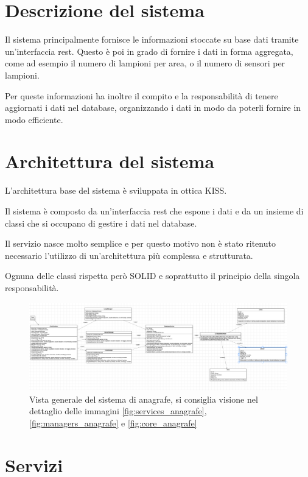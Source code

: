 \section{Descrizione del sistema}

Il sistema principalmente fornisce le informazioni stoccate su base dati tramite un'interfaccia rest.
Questo è poi in grado di fornire i dati in forma aggregata, come ad esempio il numero di lampioni per area, o il numero di sensori per lampioni.

Per queste informazioni ha inoltre il compito e la responsabilità di tenere aggiornati i dati nel database, organizzando i dati in modo da poterli fornire in modo efficiente.

\section{Architettura del sistema}

L'architettura base del sistema è sviluppata in ottica KISS.

Il sistema è composto da un'interfaccia rest che espone i dati e da un insieme di classi che si occupano di gestire i dati nel database.

Il servizio nasce molto semplice e per questo motivo non è stato ritenuto necessario l'utilizzo di un'architettura più complessa e strutturata.

Ognuna delle classi rispetta però SOLID e soprattutto il principio della singola responsabilità.

\begin{figure}[ht]
    \centering
    \includegraphics[width=\textwidth]{img/anagrafe_generale.png}
    \caption{Vista generale del sistema di anagrafe, si consiglia visione nel dettaglio delle immagini \ref{fig:services_anagrafe}, \ref{fig:managers_anagrafe} e \ref{fig:core_anagrafe}}
    \label{fig:general_anagrafe}
\end{figure}

\section{Servizi}

